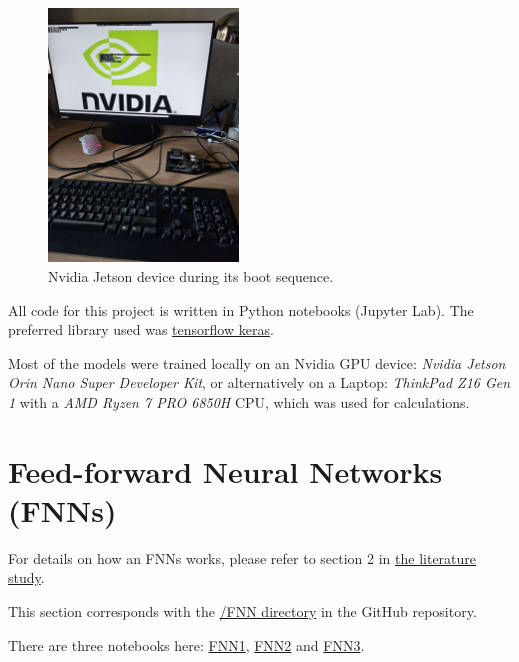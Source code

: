 \documentclass{article}
\begin{document}
\begin{figure}
    \centering
    \includegraphics[width=0.45\textwidth]{images/JetsonBoot.jpg}
    \caption{Nvidia Jetson device during its boot sequence.}
    \label{fig:JetsonBoot}
\end{figure}

All code for this project is written in Python notebooks (Jupyter Lab). The preferred library used was \href{https://www.tensorflow.org/guide/keras}{tensorflow keras}.

Most of the models were trained locally on an Nvidia GPU device: \textit{Nvidia Jetson Orin Nano Super Developer Kit}, or alternatively on a Laptop: \textit{ThinkPad Z16 Gen 1} with a \textit{AMD Ryzen 7 PRO 6850H} CPU, which was used for calculations.





\newpage
\tableofcontents
\newpage

\section{Feed-forward Neural Networks (FNNs)}
For details on how an FNNs works, please refer to section 2 in \href{https://github.com/AntonStantan/matura/blob/main/zwischenProdukt/LiteraturstudieAnton.pdf}{the literature study}.

This section corresponds with the \href{https://github.com/AntonStantan/matura/tree/main/FNN}{/FNN directory} in the GitHub repository.

There are three notebooks here: \href{https://github.com/AntonStantan/matura/blob/main/FNN/FNN1.ipynb}{FNN1}, \href{https://github.com/AntonStantan/matura/blob/main/FNN/FNN2.ipynb}{FNN2} and \href{https://github.com/AntonStantan/matura/blob/main/FNN/FNN3.ipynb}{FNN3}.
\end{document}
